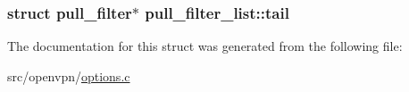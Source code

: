 \subsubsection[{tail}]{\setlength{\rightskip}{0pt plus 5cm}struct {\bf pull\+\_\+filter}$\ast$ pull\+\_\+filter\+\_\+list\+::tail}\label{structpull__filter__list_a30c7e98b27b7aeac18be4e3341f1038d}


The documentation for this struct was generated from the following file\+:\begin{DoxyCompactItemize}
\item 
src/openvpn/\hyperlink{options_8c}{options.\+c}\end{DoxyCompactItemize}
